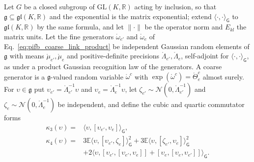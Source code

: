 Let $G$ be a closed subgroup of $\mathrm{GL}(K,\mathbb R)$ acting by inclusion, so that $\mathfrak g\subseteq\mathfrak{gl}(K,\mathbb R)$ and the exponential is the matrix exponential; extend $\langle\cdot,\cdot\rangle_{\mathsf G}$ to $\mathfrak{gl}(K,\mathbb R)$ by the same formula, and let $\|\cdot\|$ be the operator norm and $E_{kl}$ the matrix units. Let the fine generators $\mathring\omega_{e'}$ and $\mathring\omega_e$ of Eq.~\eqref{eq:pifb_coarse_link_product} be independent Gaussian random elements of $\mathfrak g$ with means $\mathring\mu_{e'},\mathring\mu_e$ and positive-definite precisions $\mathring\Lambda_{e'},\mathring\Lambda_e$, self-adjoint for $\langle\cdot,\cdot\rangle_{\mathsf G}$, as under a product Gaussian recognition law of the generators. A coarse generator is a $\mathfrak g$-valued random variable $\mathring\omega^c$ with $\exp(\mathring\omega^c)=\mathring\Theta^c_e$ almost surely. For $\upsilon\in\mathfrak g$ put $\upsilon_{e'}=\mathring\Lambda_{e'}^{-1}\upsilon$ and $\upsilon_e=\mathring\Lambda_e^{-1}\upsilon$, let $\zeta_{e'}\sim\mathcal N(0,\mathring\Lambda_{e'}^{-1})$ and $\zeta_e\sim\mathcal N(0,\mathring\Lambda_e^{-1})$ be independent, and define the cubic and quartic commutator forms
\begin{equation}
\begin{aligned}
\kappa_3(\upsilon)={}&\langle\upsilon,[\upsilon_{e'},\upsilon_e]\rangle_{\mathsf G},\\
\kappa_4(\upsilon)={}&3\mathbb E\langle\upsilon,[\upsilon_{e'},\zeta_e]\rangle_{\mathsf G}^2+3\mathbb E\langle\upsilon,[\zeta_{e'},\upsilon_e]\rangle_{\mathsf G}^2\\
&+2\langle\upsilon,[\upsilon_{e'},[\upsilon_{e'},\upsilon_e]]+[\upsilon_e,[\upsilon_e,\upsilon_{e'}]]\rangle_{\mathsf G}.
\end{aligned}
\label{eq:llp_cumulant_forms}
\end{equation}

